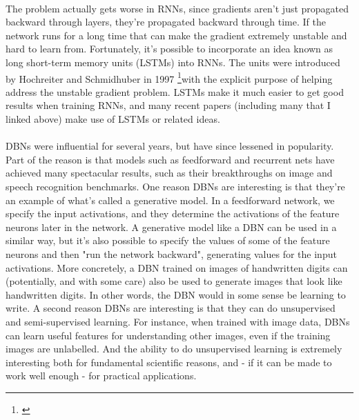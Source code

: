 \paragraph{} The problem actually gets worse in RNNs, since gradients aren't just propagated backward through layers, they're propagated backward through time. If the network runs for a long time that can make the gradient extremely unstable and hard to learn from. Fortunately, it's possible to incorporate an idea known as long short-term memory units (LSTMs) into RNNs. The units were introduced by Hochreiter and Schmidhuber in 1997 \footnote{\href{http://dx.doi.org/10.1162/neco.1997.9.8.1735}{}}with the explicit purpose of helping address the unstable gradient problem. LSTMs make it much easier to get good results when training RNNs, and many recent papers (including many that I linked above) make use of LSTMs or related ideas.
\paragraph{} DBNs were influential for several years, but have since lessened in popularity. Part of the reason is that models such as feedforward and recurrent nets have achieved many spectacular results, such as their breakthroughs on image and speech recognition benchmarks. One reason DBNs are interesting is that they're an example of what's called a generative model. In a feedforward network, we specify the input activations, and they determine the activations of the feature neurons later in the network. A generative model like a DBN can be used in a similar way, but it's also possible to specify the values of some of the feature neurons and then "run the network backward", generating values for the input activations. More concretely, a DBN trained on images of handwritten digits can (potentially, and with some care) also be used to generate images that look like handwritten digits. In other words, the DBN would in some sense be learning to write. A second reason DBNs are interesting is that they can do unsupervised and semi-supervised learning. For instance, when trained with image data, DBNs can learn useful features for understanding other images, even if the training images are unlabelled. And the ability to do unsupervised learning is extremely interesting both for fundamental scientific reasons, and - if it can be made to work well enough - for practical applications.
